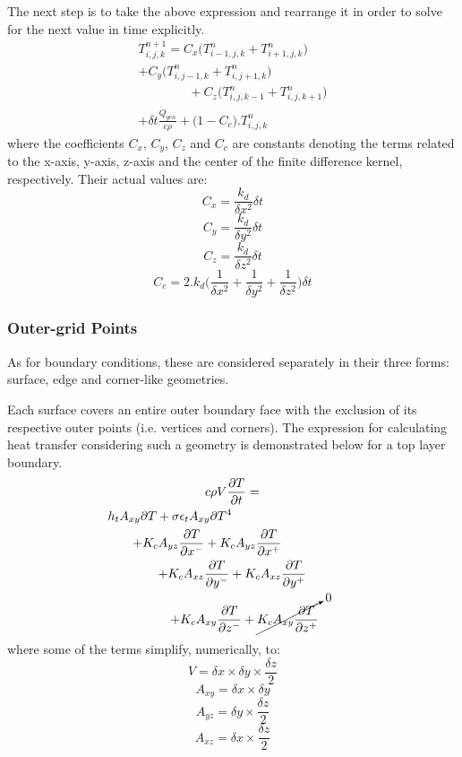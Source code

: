 \documentclass[a4paper,10pt]{IEEEtran}
\begin{document}
	The next step is to take the above expression and rearrange it in order to solve for the next value in time explicitly.
		\begin{multline}
		T_{i,j,k}^{n+1} = C_x\Big( T_{i-1,j,k}^n+T_{i+1,j,k}^n \Big)\\ 
		+ C_y \Big( T_{i,j-1,k}^n+T_{i,j+1,k}^n \Big)  \\
		\qquad \qquad + C_z \Big( T_{i,j,k-1}^n+T_{i,j,k+1}^n \Big)\\ 
		+ \delta t\frac{\dot{Q}_{gen}}{c\rho} + \Big( 1 - C_c \Big).T_{i,j,k}^n 
		\end{multline}
	where the coefficients $C_x$, $C_y$, $C_z$ and $C_c$ are constants denoting the terms related to the x-axis, y-axis, z-axis and the center of the finite difference kernel, respectively. Their actual values are:
	$$C_x = \frac{k_d}{\delta x^2} \delta t$$
	$$C_y =  \frac{k_d}{\delta y^2} \delta t$$
	$$C_z = \frac{k_d}{\delta z^2} \delta t$$
	$$C_c = 2.k_d\Big( \frac{1}{\delta x^2}+\frac{1}{\delta y^2}+\frac{1}{\delta z^2} \Big)\delta t$$
		
	
	
	\subsubsection{Outer-grid Points}
	As for boundary conditions, these are considered separately in their three forms: surface, edge and corner-like geometries.
	
	Each surface covers an entire outer boundary face with the exclusion of its respective outer points (i.e. vertices and corners). The expression for calculating heat transfer considering such a geometry is demonstrated below for a top layer boundary.
	\begin{multline}
	c\rho V \frac{\partial T}{\partial t} = \\
	h_t A_{xy} \partial T + \sigma \epsilon_t A_{xy} \partial T^4 \qquad \qquad \qquad \qquad \qquad \\
	+ K_c A_{yz}\frac{\partial T}{\partial x^-} + K_c A_{yz}\frac{\partial T}{\partial x^+} \qquad \qquad \\
	+ K_c A_{xz}\frac{\partial T}{\partial y^-} + K_c A_{xz}\frac{\partial T}{\partial y^+} \\
	\qquad + K_c A_{xy} \frac{\partial T}{\partial z^-} + \cancelto{0}{K_c A_{xy} \frac{\partial T}{\partial z^+}}
	\end{multline}
	where some of the terms simplify, numerically, to:
	$$V = \delta x \times \delta y \times \frac{\delta z}{2} $$
	$$A_{xy} = \delta x \times \delta y $$
	$$A_{yz} = \delta y \times \frac{\delta z}{2} $$
	$$A_{xz} = \delta x \times \frac{\delta z}{2} $$
	
\end{document}
